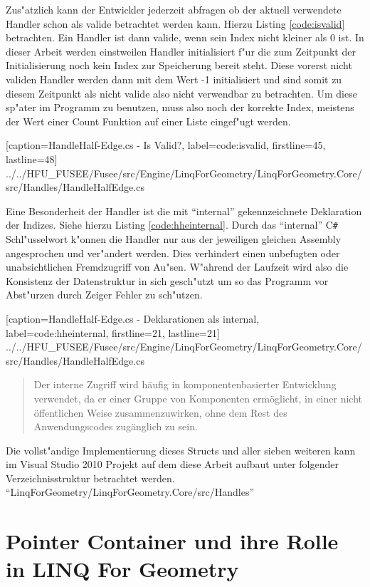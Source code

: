 \documentclass[pagesize, paper=a4, fontsize=12pt,titlepage=true, headings=small, headnosepline, abstractoff, liststotoc, nochapterprefix, plainheadsepline]{scrreprt}
\newcommand{\CSS}{C\texttt{\# }}
\newcommand{\LFG}{LINQ For Geometry}
\begin{document}
Zus"atzlich kann der Entwickler jederzeit abfragen ob der aktuell verwendete Handler schon als valide betrachtet werden kann. Hierzu Listing \ref{code:isvalid} betrachten. Ein Handler ist dann valide, wenn sein Index nicht kleiner als 0 ist. In dieser Arbeit werden einstweilen Handler initialisiert f"ur die zum Zeitpunkt der Initialisierung noch kein Index zur Speicherung bereit steht. Diese vorerst nicht validen Handler werden dann mit dem Wert -1 initialisiert und sind somit zu diesem Zeitpunkt als nicht valide also nicht verwendbar zu betrachten. Um diese sp"ater im Programm zu benutzen, muss also noch der korrekte Index, meistens der Wert einer Count Funktion auf einer Liste eingef"ugt werden.

			[caption={HandleHalf-Edge.cs - Is Valid?}, label=code:isvalid, firstline=45, lastline=48]
			{../../HFU_FUSEE/Fusee/src/Engine/LinqForGeometry/LinqForGeometry.Core/src/Handles/HandleHalfEdge.cs}

Eine Besonderheit der Handler ist die mit "`internal"' gekennzeichnete Deklaration der Indizes. Siehe hierzu Listing \ref{code:hheinternal}. Durch das "`internal"' \CSS Schl"usselwort k"onnen die Handler nur aus der jeweiligen gleichen Assembly angesprochen und ver"andert werden. Dies verhindert einen unbefugten oder unabsichtlichen Fremdzugriff von Au"sen. W"ahrend der Laufzeit wird also die Konsistenz der Datenstruktur in sich gesch"utzt um so das Programm vor Abst"urzen durch Zeiger Fehler zu sch"utzen.

			[caption={HandleHalf-Edge.cs - Deklarationen als internal}, label=code:hheinternal, firstline=21, lastline=21]
			{../../HFU_FUSEE/Fusee/src/Engine/LinqForGeometry/LinqForGeometry.Core/src/Handles/HandleHalfEdge.cs}

\begin{quote}{\dq}Der interne Zugriff wird h{\"a}ufig in komponentenbasierter Entwicklung verwendet, da er einer Gruppe von Komponenten erm{\"o}glicht, in einer nicht {\"o}ffentlichen Weise zusammenzuwirken, ohne dem Rest des Anwendungscodes zug{\"a}nglich zu sein.{\dq} \cite{MicrosoftCReferenz.2013}\end{quote}


Die vollst"andige Implementierung dieses Structs und aller sieben weiteren kann im Visual Studio 2010 Projekt auf dem diese Arbeit aufbaut unter folgender Verzeichnisstruktur betrachtet werden. "`LinqForGeometry/LinqForGeometry.Core/src/Handles"'

\section {Pointer Container und ihre Rolle in \LFG}
\end{document}
